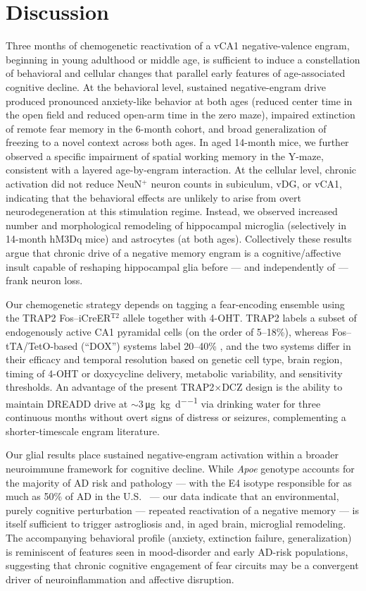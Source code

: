 \documentclass[11pt]{article}
\begin{document}
\section{Discussion}
Three months of chemogenetic reactivation of a vCA1 negative-valence engram, beginning in young adulthood or middle age, is sufficient to induce a constellation of behavioral and cellular changes that parallel early features of age-associated cognitive decline. At the behavioral level, sustained negative-engram drive produced pronounced anxiety-like behavior at both ages (reduced center time in the open field and reduced open-arm time in the zero maze), impaired extinction of remote fear memory in the 6-month cohort, and broad generalization of freezing to a novel context across both ages. In aged 14-month mice, we further observed a specific impairment of spatial working memory in the Y-maze, consistent with a layered age-by-engram interaction. At the cellular level, chronic activation did not reduce NeuN$^{+}$ neuron counts in subiculum, vDG, or vCA1, indicating that the behavioral effects are unlikely to arise from overt neurodegeneration at this stimulation regime. Instead, we observed increased number and morphological remodeling of hippocampal microglia (selectively in 14-month hM3Dq mice) and astrocytes (at both ages). Collectively these results argue that chronic drive of a negative memory engram is a cognitive/affective insult capable of reshaping hippocampal glia before --- and independently of --- frank neuron loss.

Our chemogenetic strategy depends on tagging a fear-encoding ensemble using the TRAP2 Fos--iCreER$^{\mathrm{T2}}$ allele together with 4-OHT. TRAP2 labels a subset of endogenously active CA1 pyramidal cells (on the order of 5--18\%), whereas Fos--tTA/TetO-based (``DOX'') systems label 20--40\% \citep{denardo2019,monasterio2024}, and the two systems differ in their efficacy and temporal resolution based on genetic cell type, brain region, timing of 4-OHT or doxycycline delivery, metabolic variability, and sensitivity thresholds. An advantage of the present TRAP2$\times$DCZ design is the ability to maintain DREADD drive at $\sim$3\,\si{\micro\gram\per\kilogram\per\day} via drinking water for three continuous months without overt signs of distress or seizures, complementing a shorter-timescale engram literature.

Our glial results place sustained negative-engram activation within a broader neuroimmune framework for cognitive decline. While \emph{Apoe} genotype accounts for the majority of AD risk and pathology \citep{johnson2015,schuff2009} --- with the E4 isotype responsible for as much as 50\% of AD in the U.S.\ \citep{raber2003} --- our data indicate that an environmental, purely cognitive perturbation --- repeated reactivation of a negative memory --- is itself sufficient to trigger astrogliosis and, in aged brain, microglial remodeling. The accompanying behavioral profile (anxiety, extinction failure, generalization) is reminiscent of features seen in mood-disorder and early AD-risk populations, suggesting that chronic cognitive engagement of fear circuits may be a convergent driver of neuroinflammation and affective disruption.
\end{document}
